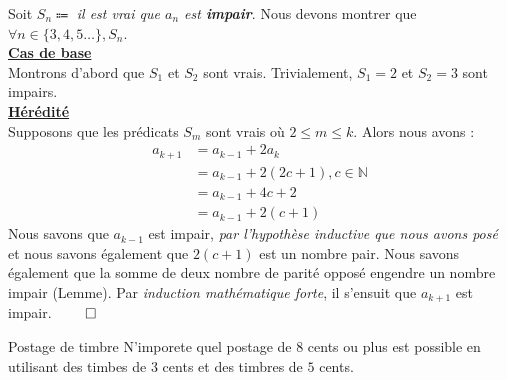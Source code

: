 \documentclass[16pt]{report}
\begin{document}
\begin{multicols*}{2}
            \begin{Preuve}{}{}
                Soit $S_n \Coloneqq$ \textit{il est vrai que \; $a_n$ est \textbf{impair}}.   
                Nous devons montrer que $\forall n \in \{3, 4,  5 \dots  \} , S_n$.  \\ 
                \underline{\textbf{Cas de base}} \\  
                Montrons d'abord que $S_1$ et $S_2$ sont vrais. Trivialement, $S_1 = 2$ et $S_2 =3$ sont 
                impairs. \\
                \underline{\textbf{Hérédité}} \\
                Supposons que les prédicats $S_m$ sont vrais où $2 \leq m \leq k$.
                Alors nous avons :
                \begin{align*}
                    a_{k+1} &= a_{k-1} + 2a_{k} \\ 
                         &= a_{k-1} + 2(2c + 1), c \in \mathbb{N} \\ 
                         &= a_{k-1} + 4c + 2 \\ 
                         &= a_{k-1} + 2(c+1)
                \end{align*}
                Nous savons que $a_{k-1}$ est impair, 
                \textcolor{myb}{\textit{par l'hypothèse inductive que nous avons posé}  }   
                et nous savons également que $2(c+1)$ est un nombre pair. Nous savons également 
                que la somme de deux nombre de parité opposé engendre un nombre impair (Lemme).
                Par \textit{induction mathématique forte}, il s'ensuit que $a_{k+1}$ est impair. $\qed$ 
            \end{Preuve}        

            \begin{Theorem}{Postage de timbre}{}
                N'imporete quel postage de $8$ cents ou plus est possible en utilisant des timbes de 
                $3$ cents et des timbres de $5$ cents. 
            \end{Theorem}


\end{multicols*}
\end{document}
